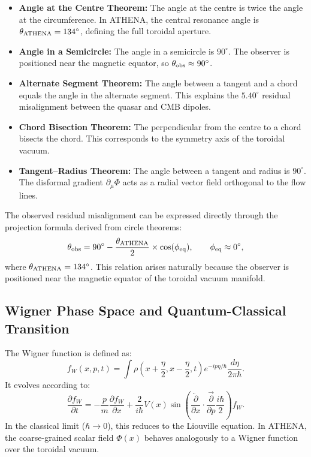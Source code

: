 \documentclass[12pt, a4paper]{article}
\begin{document}
\begin{itemize}
    \item \textbf{Angle at the Centre Theorem:} The angle at the centre is twice the angle at the circumference. In ATHENA, the central resonance angle is $\theta_{\rm ATHENA} = 134^\circ$, defining the full toroidal aperture.
    \item \textbf{Angle in a Semicircle:} The angle in a semicircle is $90^\circ$. The observer is positioned near the magnetic equator, so $\theta_{\rm obs} \approx 90^\circ$.
    \item \textbf{Alternate Segment Theorem:} The angle between a tangent and a chord equals the angle in the alternate segment. This explains the $5.40^\circ$ residual misalignment between the quasar and CMB dipoles.
    \item \textbf{Chord Bisection Theorem:} The perpendicular from the centre to a chord bisects the chord. This corresponds to the symmetry axis of the toroidal vacuum.
    \item \textbf{Tangent–Radius Theorem:} The angle between a tangent and radius is $90^\circ$. The disformal gradient $\partial_\mu \Phi$ acts as a radial vector field orthogonal to the flow lines.
\end{itemize}

The observed residual misalignment can be expressed directly through the projection formula derived from circle theorems:
\begin{equation}
\theta_{\rm obs} = 90^\circ - \frac{\theta_{\rm ATHENA}}{2} \times \cos(\phi_{\rm eq}), \qquad \phi_{\rm eq} \approx 0^\circ,
\end{equation}
where $\theta_{\rm ATHENA} = 134^\circ$. This relation arises naturally because the observer is positioned near the magnetic equator of the toroidal vacuum manifold.

\subsection{Wigner Phase Space and Quantum-Classical Transition}
The Wigner function is defined as:
\begin{equation}
f_W(x,p,t) = \int \rho\left(x+\frac{\eta}{2}, x-\frac{\eta}{2}, t\right) e^{-ip\eta/\hbar} \frac{d\eta}{2\pi\hbar}.
\end{equation}
It evolves according to:
\begin{equation}
\frac{\partial f_W}{\partial t} = -\frac{p}{m}\frac{\partial f_W}{\partial x} + \frac{2}{i\hbar} V(x) \sin\left( \frac{\overleftarrow{\partial}}{\partial x} \cdot \frac{\overrightarrow{\partial}}{\partial p} \frac{i\hbar}{2} \right) f_W.
\end{equation}
In the classical limit ($\hbar \to 0$), this reduces to the Liouville equation. In ATHENA, the coarse-grained scalar field $\Phi(x)$ behaves analogously to a Wigner function over the toroidal vacuum.
\end{document}
